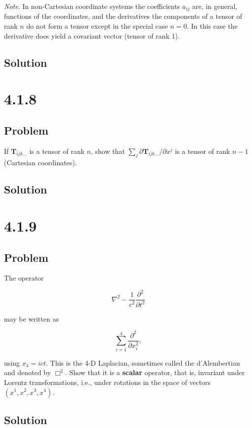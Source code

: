 \documentclass[12pt]{article}
\begin{document}
\textit{Note}. In non-Cartesian coordinate systems the coefficients \(a_{ij}\) are, in general,
functions of the coordinates, and the derivatives the components of a tensor of rank \(n\) do
not form a tensor except in the special case \(n = 0\). In this case the derivative does yield a
covariant vector (tensor of rank 1).

\subsection{Solution}



\newpage
\section{4.1.8}

\subsection{Problem}

If \(\textbf{T}_{ijk\ldots}\) is a tensor of rank \(n\), show that
\(\sum_j \partial \textbf{T}_{ijk\ldots}/\partial x^j\) is a tensor of rank \(n - 1\)
(Cartesian coordinates).

\subsection{Solution}

\newpage
\section{4.1.9}

\subsection{Problem}

The operator

\[
    \nabla^2 - \frac{1}{c^2} \frac{\partial^2}{\partial t^2}
\]

may be written as

\[
    \sum^4_{i = 1} \frac{\partial^2}{\partial x^2_i},
\]

using \(x_4 = ict\). This is the 4-D Laplacian, sometimes called the d'Alember\-tian and denoted
by \(\Box^2\). Show that it is a \textbf{scalar} operator, that is, invariant under Lorentz
transformations, i.e., under rotations in the space of vectors \((x^1, x^2, x^3, x^4)\).

\subsection{Solution}



\newpage


\nocite{arfken2013mathematical}
\nocite{El-Deeb_PEU-356_Assignments}
\end{document}
